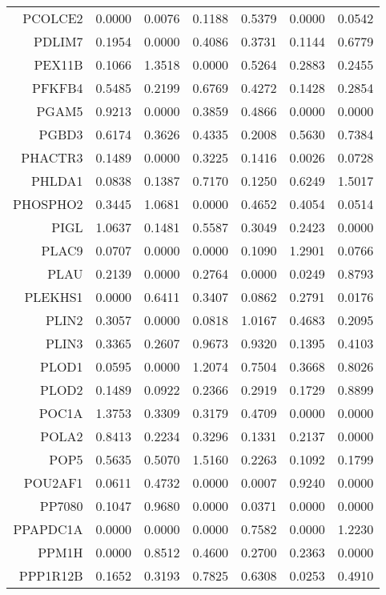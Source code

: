 \begin{longtable}{rrrrrrr}
  PCOLCE2 & 0.0000 & 0.0076 & 0.1188 & 0.5379 & 0.0000 & 0.0542 \\ 
  PDLIM7 & 0.1954 & 0.0000 & 0.4086 & 0.3731 & 0.1144 & 0.6779 \\ 
  PEX11B & 0.1066 & 1.3518 & 0.0000 & 0.5264 & 0.2883 & 0.2455 \\ 
  PFKFB4 & 0.5485 & 0.2199 & 0.6769 & 0.4272 & 0.1428 & 0.2854 \\ 
  PGAM5 & 0.9213 & 0.0000 & 0.3859 & 0.4866 & 0.0000 & 0.0000 \\ 
  PGBD3 & 0.6174 & 0.3626 & 0.4335 & 0.2008 & 0.5630 & 0.7384 \\ 
  PHACTR3 & 0.1489 & 0.0000 & 0.3225 & 0.1416 & 0.0026 & 0.0728 \\ 
  PHLDA1 & 0.0838 & 0.1387 & 0.7170 & 0.1250 & 0.6249 & 1.5017 \\ 
  PHOSPHO2 & 0.3445 & 1.0681 & 0.0000 & 0.4652 & 0.4054 & 0.0514 \\ 
  PIGL & 1.0637 & 0.1481 & 0.5587 & 0.3049 & 0.2423 & 0.0000 \\ 
  PLAC9 & 0.0707 & 0.0000 & 0.0000 & 0.1090 & 1.2901 & 0.0766 \\ 
  PLAU & 0.2139 & 0.0000 & 0.2764 & 0.0000 & 0.0249 & 0.8793 \\ 
  PLEKHS1 & 0.0000 & 0.6411 & 0.3407 & 0.0862 & 0.2791 & 0.0176 \\ 
  PLIN2 & 0.3057 & 0.0000 & 0.0818 & 1.0167 & 0.4683 & 0.2095 \\ 
  PLIN3 & 0.3365 & 0.2607 & 0.9673 & 0.9320 & 0.1395 & 0.4103 \\ 
  PLOD1 & 0.0595 & 0.0000 & 1.2074 & 0.7504 & 0.3668 & 0.8026 \\ 
  PLOD2 & 0.1489 & 0.0922 & 0.2366 & 0.2919 & 0.1729 & 0.8899 \\ 
  POC1A & 1.3753 & 0.3309 & 0.3179 & 0.4709 & 0.0000 & 0.0000 \\ 
  POLA2 & 0.8413 & 0.2234 & 0.3296 & 0.1331 & 0.2137 & 0.0000 \\ 
  POP5 & 0.5635 & 0.5070 & 1.5160 & 0.2263 & 0.1092 & 0.1799 \\ 
  POU2AF1 & 0.0611 & 0.4732 & 0.0000 & 0.0007 & 0.9240 & 0.0000 \\ 
  PP7080 & 0.1047 & 0.9680 & 0.0000 & 0.0371 & 0.0000 & 0.0000 \\ 
  PPAPDC1A & 0.0000 & 0.0000 & 0.0000 & 0.7582 & 0.0000 & 1.2230 \\ 
  PPM1H & 0.0000 & 0.8512 & 0.4600 & 0.2700 & 0.2363 & 0.0000 \\ 
  PPP1R12B & 0.1652 & 0.3193 & 0.7825 & 0.6308 & 0.0253 & 0.4910 \\ 

\end{longtable}
